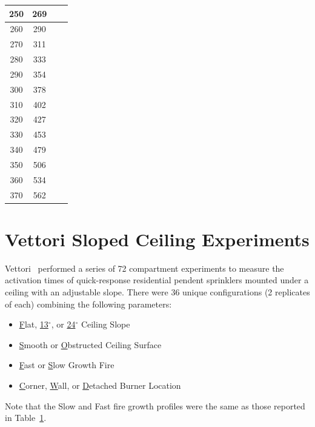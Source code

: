 \begin{table}[h!]
\begin{center}
\begin{tabular}{|c|c|c|c|}
250		&  269     &            &        \\ \hline
260		&  290     &            &        \\ \hline
270		&  311     &            &        \\ \hline
280		&  333     &            &        \\ \hline
290		&  354     &            &        \\ \hline
300		&  378     &            &        \\ \hline
310		&  402     &            &        \\ \hline
320		&  427     &            &        \\ \hline
330		&  453     &            &        \\ \hline
340		&  479     &            &        \\ \hline
350		&  506     &            &        \\ \hline
360		&  534     &            &        \\ \hline
370		&  562     &            &        \\ \hline
\end{tabular}
\end{center}
\label{Vettori_Ramps}
\end{table}

\section{Vettori Sloped Ceiling Experiments}
\label{Vettori_Sloped_Ceiling_Description}

Vettori~\cite{Vettori:2} performed a series of 72 compartment experiments to measure the activation times of quick-response residential pendent sprinklers mounted under a ceiling with an adjustable slope. There were 36 unique configurations (2 replicates of each) combining the following parameters:
\begin{itemize}
\item \underline{F}lat, \underline{13}$^\circ$, or \underline{24}$^\circ$ Ceiling Slope
\item \underline{S}mooth or \underline{O}bstructed Ceiling Surface
\item \underline{F}ast or \underline{S}low Growth Fire
\item \underline{C}orner, \underline{W}all, or \underline{D}etached Burner Location
\end{itemize}
Note that the Slow and Fast fire growth profiles were the same as those reported in Table~\ref{Vettori_Ramps}.





